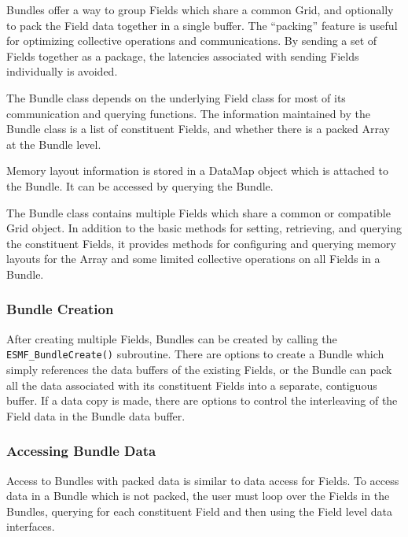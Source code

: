 

Bundles offer a way to group Fields which share a common Grid, and 
optionally to pack the Field data together in a single buffer.  The
``packing'' feature is useful for optimizing collective operations and
communications.  By sending a set of Fields together as a package,
the latencies associated with sending Fields individually is avoided.

The Bundle class depends on the underlying Field class for most of its
communication and querying functions.  The information maintained 
by the Bundle class is a list of constituent Fields, and whether 
there is a packed Array at the Bundle level.

Memory layout information is stored in a DataMap object which
is attached to the Bundle.  It can be accessed by querying the Bundle.

The Bundle class contains multiple Fields which share a
common or compatible Grid object.  In addition to the basic methods for
setting, retrieving, and querying the constituent Fields, it provides
methods for configuring and querying memory layouts for the Array
and some limited collective operations on all Fields in a Bundle.

\subsubsection{Bundle Creation}

After creating multiple Fields, Bundles can be created
by calling the {\tt ESMF\_BundleCreate()} subroutine.  There are
options to create a Bundle which simply references
the data buffers of the existing Fields, or the Bundle can pack 
all the data associated with its constituent Fields into a 
separate, contiguous buffer.  If a data copy is made, there are options to
control the interleaving of the Field data in the Bundle data buffer.

\subsubsection{Accessing Bundle Data}

Access to Bundles with packed data is similar to data access
for Fields.  To access data in a Bundle which is not packed, the 
user must loop over the Fields in the Bundles, querying for each
constituent Field and then using the Field level data interfaces.

